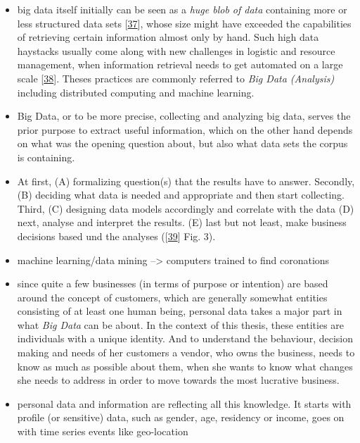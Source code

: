 \documentclass[12pt,english,a4paper,titlepage,cleardoublepage=empty,dottedtoc]{report}
\begin{document}
\begin{itemize}
\item
  big data itself initially can be seen as a \emph{huge blob of data}
  containing more or less structured data sets
  {[}\protect\hyperlink{ref-web_2016_oxford_definition_big-data}{37}{]},
  whose size might have exceeded the capabilities of retrieving certain
  information almost only by hand. Such high data haystacks usually come
  along with new challenges in logistic and resource management, when
  information retrieval needs to get automated on a large scale
  {[}\protect\hyperlink{ref-web_2016_wikipedia_definition_big-data}{38}{]}.
  Theses practices are commonly referred to \emph{Big Data (Analysis)}
  including distributed computing and machine learning.
\item
  Big Data, or to be more precise, collecting and analyzing big data,
  serves the prior purpose to extract useful information, which on the
  other hand depends on what was the opening question about, but also
  what data sets the corpus is containing.
\item
  At first, (A) formalizing question(s) that the results have to answer.
  Secondly, (B) deciding what data is needed and appropriate and then
  start collecting. Third, (C) designing data models accordingly and
  correlate with the data (D) next, analyse and interpret the results.
  (E) last but not least, make business decisions based und the analyses
  ({[}\protect\hyperlink{ref-paper_2015_big-data-analytics_a-survey}{39}{]}
  Fig. 3).
\item
  machine learning/data mining --\textgreater{} computers trained to
  find coronations
\item
  since quite a few businesses (in terms of purpose or intention) are
  based around the concept of customers, which are generally somewhat
  entities consisting of at least one human being, personal data takes a
  major part in what \emph{Big Data} can be about. In the context of
  this thesis, these entities are individuals with a unique identity.
  And to understand the behaviour, decision making and needs of her
  customers a vendor, who owns the business, needs to know as much as
  possible about them, when she wants to know what changes she needs to
  address in order to move towards the most lucrative business.
\item
  personal data and information are reflecting all this knowledge. It
  starts with profile (or sensitive) data, such as gender, age,
  residency or income, goes on with time series events like geo-location

\end{itemize}
\end{document}
